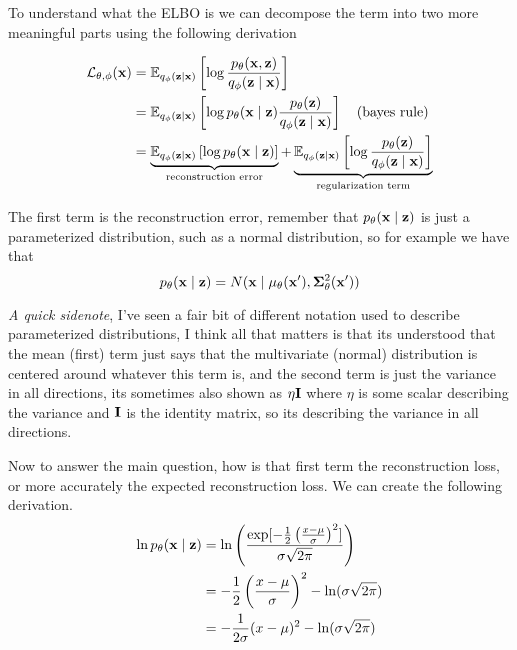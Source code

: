\documentclass[12pt]{article}
\begin{document}
To understand what the ELBO is we can decompose the term into two more meaningful parts using the following derivation 

\begin{align*}
    \mathcal L_{\theta, \phi}(\mathbf{x}) &= \operatorname{\mathbb{E}}_{q_\phi(\mathbf{z}\mid \mathbf{x})} \left[\log \frac{p_\theta(\mathbf{x}, \mathbf{z})}{q_\phi(\mathbf{z}\mid \mathbf{x})} \right] \\
    &= \operatorname{\mathbb{E}}_{q_\phi(\mathbf{z}\mid \mathbf{x})} \left[\log p_\theta(\mathbf{x}\mid \mathbf{z}) \frac{p_\theta(\mathbf{z})}{q_\phi(\mathbf{z} \mid \mathbf{x})}\right] \quad (\text{bayes rule})\\ 
    &= \underbrace{\operatorname{\mathbb{E}}_{q_\phi(\mathbf{z}\mid \mathbf{x})} \left[\log p_\theta(\mathbf{x}\mid \mathbf{z}) \right]}_{\text{reconstruction error}} + \underbrace{\operatorname{\mathbb{E}}_{q_\phi(\mathbf{z}\mid \mathbf{x})} \left[\log \frac{p_\theta(\mathbf{z})}{q_\phi(\mathbf{z}\mid \mathbf{x})}\right]}_{\text{regularization term}}
\end{align*}

The first term is the reconstruction error, remember that $p_\theta(\mathbf{x} \mid \mathbf{z})$ is just a parameterized distribution, such as a normal distribution, so for example we have that 
\[
    p_\theta(\mathbf{x} \mid \mathbf{z}) = N(\mathbf{x} \mid \mu_\theta(\mathbf{x}'), \mathbf{\Sigma}^2_\theta(\mathbf{x}'))    
\] 

\textit{A quick sidenote}, I've seen a fair bit of different notation used to describe parameterized distributions, I think all that matters is that its understood that the mean (first) term just says that the multivariate (normal) distribution is centered around whatever this term is, and the second term is just the variance in all directions, its sometimes also shown as $\eta \mathbf{I}$ where $\eta$ is some scalar describing the variance and $\mathbf{I}$ is the identity matrix, so its describing the variance in all directions.
\smallskip

Now to answer the main question, how is that first term the reconstruction loss, or more accurately the expected reconstruction loss. We can create the following derivation.
\begin{align*}
    \ln p_\theta(\mathbf{x} \mid \mathbf{z}) &= \ln \left( \frac{\exp[-\frac{1}{2}\left(\frac{x-\mu}{\sigma}\right)^2]}{\sigma\sqrt{2\pi}}\right) \\
    &= -\frac{1}{2}\left(\frac{x-\mu}{\sigma}\right)^2 - \ln(\sigma\sqrt{2\pi}) \\ 
    &= -\frac{1}{2\sigma}(x-\mu)^2 - \ln(\sigma\sqrt{2\pi}) \\
\end{align*}
\end{document}
